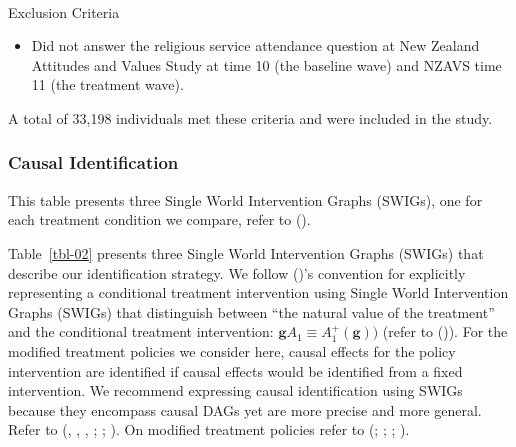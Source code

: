 \documentclass[
  single column]{article}
\makeatletter
\let\oldparagraph\paragraph
\renewcommand{\paragraph}{
    \@ifstar
      \xxxParagraphStar
      \xxxParagraphNoStar
  }
\newcommand{\xxxParagraphStar}[1]{\oldparagraph*{#1}\mbox{}}
\newcommand{\xxxParagraphNoStar}[1]{\oldparagraph{#1}\mbox{}}
\providecommand{\tightlist}{%
  \setlength{\itemsep}{0pt}\setlength{\parskip}{0pt}}\usepackage{longtable,booktabs,array}
\makeatother
\begin{document}
\paragraph{Exclusion Criteria}\label{exclusion-criteria}

\begin{itemize}
\tightlist
\item
  Did not answer the religious service attendance question at New
  Zealand Attitudes and Values Study at time 10 (the baseline wave) and
  NZAVS time 11 (the treatment wave).
\end{itemize}

A total of 33,198 individuals met these criteria and were included in
the study.

\subsubsection{Causal Identification}\label{causal-identification}

\begin{table}

\caption{\label{tbl-02}This table presents three Single World
Intervention Graphs (SWIGs), one for each treatment condition we
compare, refer to ().}

\centering{

\lmtptablethree

}

\end{table}%

Table~\ref{tbl-02} presents three Single World Intervention Graphs
(SWIGs) that describe our identification strategy. We follow
()'s
convention for explicitly representing a conditional treatment
intervention using Single World Intervention Graphs (SWIGs) that
distinguish between ``the natural value of the treatment'' and the
conditional treatment intervention:
\(\mathbf{g}{A_1} \equiv A^+_1(\mathbf{g}))\) (refer to
()). For
the modified treatment policies we consider here, causal effects for the
policy intervention are identified if causal effects would be identified
from a fixed intervention. We recommend expressing causal identification
using SWIGs because they encompass causal DAGs yet are more precise and
more general. Refer to (, ,
,
;
;
). On
modified treatment policies refer to
(;
;
;
).
\end{document}
